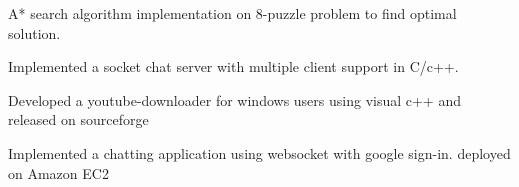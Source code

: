 



\begin{cventries}

\cvproject
{
    \begin{cvitems} %
        \item {A* search algorithm implementation on 8-puzzle problem to find optimal solution.}
        \item {Implemented a socket chat server with multiple client support in C/c++.}
        \item {Developed a youtube-downloader for windows users using visual c++ and released on sourceforge }
        \item {Implemented a chatting application using websocket with google sign-in. deployed on Amazon EC2 }
        \end{cvitems}
}

\end{cventries}
